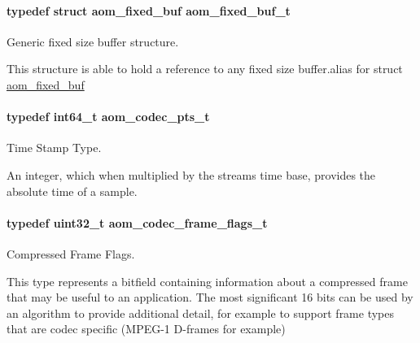 \paragraph[{\texorpdfstring{aom\+\_\+fixed\+\_\+buf\+\_\+t}{aom_fixed_buf_t}}]{\setlength{\rightskip}{0pt plus 5cm}typedef struct {\bf aom\+\_\+fixed\+\_\+buf}  {\bf aom\+\_\+fixed\+\_\+buf\+\_\+t}}\hypertarget{group__encoder_ga85cca9fad6bc25c667f013a39c607174}{}\label{group__encoder_ga85cca9fad6bc25c667f013a39c607174}


Generic fixed size buffer structure. 

This structure is able to hold a reference to any fixed size buffer.\+alias for struct \hyperlink{structaom__fixed__buf}{aom\+\_\+fixed\+\_\+buf} 
\paragraph[{\texorpdfstring{aom\+\_\+codec\+\_\+pts\+\_\+t}{aom_codec_pts_t}}]{\setlength{\rightskip}{0pt plus 5cm}typedef int64\+\_\+t {\bf aom\+\_\+codec\+\_\+pts\+\_\+t}}\hypertarget{group__encoder_ga958524226c9a65251c9e4f7bb78fc606}{}\label{group__encoder_ga958524226c9a65251c9e4f7bb78fc606}


Time Stamp Type. 

An integer, which when multiplied by the stream\textquotesingle{}s time base, provides the absolute time of a sample. 
\paragraph[{\texorpdfstring{aom\+\_\+codec\+\_\+frame\+\_\+flags\+\_\+t}{aom_codec_frame_flags_t}}]{\setlength{\rightskip}{0pt plus 5cm}typedef uint32\+\_\+t {\bf aom\+\_\+codec\+\_\+frame\+\_\+flags\+\_\+t}}\hypertarget{group__encoder_gaf776d31e60e32bee1cdbaf052a8ea12a}{}\label{group__encoder_gaf776d31e60e32bee1cdbaf052a8ea12a}


Compressed Frame Flags. 

This type represents a bitfield containing information about a compressed frame that may be useful to an application. The most significant 16 bits can be used by an algorithm to provide additional detail, for example to support frame types that are codec specific (M\+P\+E\+G-\/1 D-\/frames for example) 
